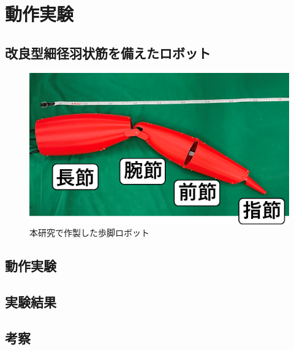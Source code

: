 \newpage
\section{動作実験}
\subsection{改良型細径羽状筋を備えたロボット}

%
\begin{figure}[ht]
    \centering
    \includegraphics[scale=0.4]{image/jikki_2.png}
    \caption{本研究で作製した歩脚ロボット}
    \label{fig:kanirobot_new}
\end{figure}
%
\subsection{動作実験}

\subsection{実験結果}

\subsection{考察}
